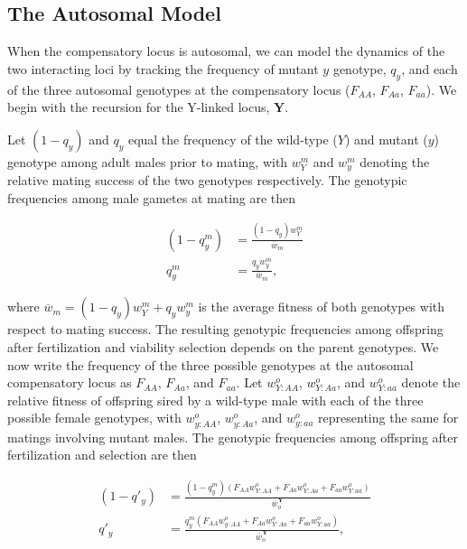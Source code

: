 \documentclass{article}
\begin{document}
\subsection{The Autosomal Model}

When the compensatory locus is autosomal, we can model the dynamics of the two interacting loci by tracking the frequency of mutant $y$ genotype, $q_{y}$, and each of the three autosomal genotypes at the compensatory locus ($F_{AA}$, $F_{Aa}$, $F_{aa}$). We begin with the recursion for the Y-linked locus, $\mathbf{Y}$.

Let $(1 - q_y)$ and $q_{y}$ equal the frequency of the wild-type ($Y$) and mutant ($y$) genotype among adult males prior to mating, with $w^{m}_{Y}$ and $w^{m}_{y}$ denoting the relative mating success of the two genotypes respectively. The genotypic frequencies among male gametes at mating are then 

\begin{subequations}\begin{align} \label{eq:Auto-qg}
	(1 - q^{m}_{y}) &= \frac{ (1 - q_y)w^{m}_{Y} }{\overline{w}_{m}} \\
	q^{m}_{y}       &= \frac{ q_y w^{m}_{y} }{\overline{w}_{m}}, 
\end{align}\end{subequations}

\noindent where $\overline{w}_{m} = (1 - q_y)w^{m}_{Y} + q_y w^{m}_{y}$ is the average fitness of both genotypes with respect to mating success. The resulting genotypic frequencies among offspring after fertilization and viability selection depends on the parent genotypes. We now write the frequency of the three possible genotypes at the autosomal compensatory locus as $F_{AA}$, $F_{Aa}$, and $F_{aa}$. Let $w^{o}_{Y:AA}$, $w^{o}_{Y:Aa}$, and $w^{o}_{Y:aa}$ denote the relative fitness of offspring sired by a wild-type male with each of the three possible female genotypes, with $w^{o}_{y:AA}$, $w^{o}_{y:Aa}$, and $w^{o}_{y:aa}$ representing the same for matings involving mutant males. The genotypic frequencies among offspring after fertilization and selection are then

\begin{subequations} \begin{align} 
	(1 - q'_{y}) &= \frac{ (1 - q^{m}_{y}) (F_{AA} w^{o}_{Y:AA} + F_{Aa} w^{o}_{Y:Aa} + F_{aa} w^{o}_{Y:aa}) }{\overline{w}^{\mathbf{Y}}_{o}} \label{eq:Auto-qPr1} \\ 
	q'_{y} &= \frac{ q^{m}_{y} (F_{AA} w^{o}_{y:AA} + F_{Aa} w^{o}_{Y:Aa} + F_{aa} w^{o}_{Y:aa}) }{\overline{w}^{\mathbf{Y}}_{o}}, \label{eq:Auto-qPr2} 
\end{align}\end{subequations}
\end{document}
